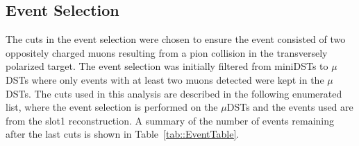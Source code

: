 \subsection{Event Selection} \label{sec::dy_eventselection}
The cuts in the event selection were chosen to ensure the event consisted of two
oppositely charged muons resulting from a pion collision in the transversely
polarized target.  The event selection was initially filtered from miniDSTs to
$\mu$DSTs where only events with at least two muons detected were kept in the
$\mu$DSTs.  The cuts used in this analysis are described in the following
enumerated list, where the event selection is performed on the $\mu$DSTs and the
events used are from the slot1 reconstruction.  A summary of the number of
events remaining after the last cuts is shown in Table~\ref{tab::EventTable}.

